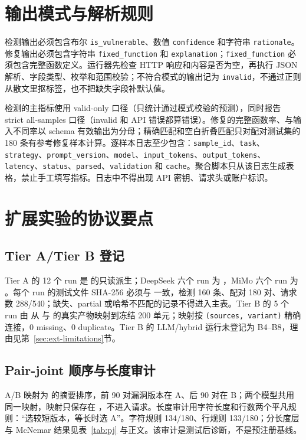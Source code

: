 \documentclass[conference]{IEEEtran}
\begin{document}
\section{输出模式与解析规则}
\label{app:schema}
检测输出必须包含布尔 \texttt{is\_vulnerable}、数值 \texttt{confidence} 和字符串 \texttt{rationale}。修复输出必须包含字符串 \texttt{fixed\_function} 和 \texttt{explanation}；\texttt{fixed\_function} 必须包含完整函数定义。运行器先检查 HTTP 响应和内容是否为空，再执行 JSON 解析、字段类型、枚举和范围校验；不符合模式的输出记为 \texttt{invalid}，不通过正则从散文里抠标签，也不把缺失字段补默认值。

检测的主指标使用 valid-only 口径（只统计通过模式校验的预测），同时报告 strict all-samples 口径（invalid 和 API 错误都算错误）。修复的完整函数率、与输入不同率以 schema 有效输出为分母；精确匹配和空白折叠匹配只对配对测试集的 180 条有参考修复样本计算。逐样本日志至少包含：\texttt{sample\_id}、\texttt{task}、\texttt{strategy}、\texttt{prompt\_version}、\texttt{model}、\texttt{input\_tokens}、\texttt{output\_tokens}、\texttt{latency}、\texttt{status}、\texttt{parsed}、\texttt{validation} 和 \texttt{cache}。聚合脚本只从该日志生成表格，禁止手工填写指标。日志中不得出现 API 密钥、请求头或账户标识。


\section{扩展实验的协议要点}
\label{app:extended-protocol}
\subsection{Tier A/Tier B 登记}
Tier A 的 12 个 run 是  的只读派生；DeepSeek 六个 run 为 ，MiMo 六个 run 为 。每个 run 的测试文件 SHA-256 必须与  一致，检测 160 条、配对 180 对、请求数 288/540；缺失、partial 或哈希不匹配的记录不得进入主表。Tier B 的 5 个 run 由  从  与  的真实产物映射到冻结 200 单元；映射按 \texttt{(sources, variant)} 精确连接，0 missing、0 duplicate。Tier B 的 LLM/hybrid 运行未登记为 B4--B8，理由见第~\ref{sec:ext-limitations}节。

\subsection{Pair-joint 顺序与长度审计}
A/B 映射为  的摘要排序，前 90 对漏洞版本在 A、后 90 对在 B；两个模型共用同一映射，映射只保存在 ，不进入请求。长度审计用字符长度和行数两个平凡规则：“选较短版本，等长时选 A”。字符规则 134/180、行规则 133/180；分长度层与 McNemar 结果见表~\ref{tab:pj} 与正文。该审计是测试后诊断，不是预注册基线。
\end{document}
